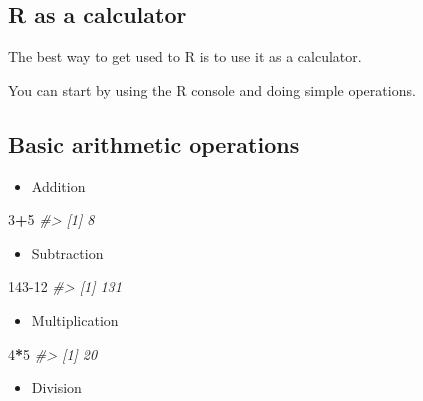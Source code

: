 \documentclass[
]{book}
\newenvironment{Shaded}{\begin{snugshade}}{\end{snugshade}}
\newcommand{\CommentTok}[1]{\textcolor[rgb]{0.56,0.35,0.01}{\textit{#1}}}
\newcommand{\DecValTok}[1]{\textcolor[rgb]{0.00,0.00,0.81}{#1}}
\newcommand{\SpecialCharTok}[1]{\textcolor[rgb]{0.81,0.36,0.00}{\textbf{#1}}}
\providecommand{\tightlist}{%
  \setlength{\itemsep}{0pt}\setlength{\parskip}{0pt}}
\begin{document}
\subsection*{R as a calculator}\label{r-as-a-calculator}

The best way to get used to R is to use it as a calculator.

You can start by using the R console and doing simple operations.

\subsection*{Basic arithmetic operations}\label{basic-arithmetic-operations}

\begin{itemize}
\tightlist
\item
  Addition
\end{itemize}

\begin{Shaded}
\begin{Highlighting}[]
\DecValTok{3}\SpecialCharTok{+}\DecValTok{5}
\CommentTok{\#\textgreater{} [1] 8}
\end{Highlighting}
\end{Shaded}

\begin{itemize}
\tightlist
\item
  Subtraction
\end{itemize}

\begin{Shaded}
\begin{Highlighting}[]
\DecValTok{143{-}12}
\CommentTok{\#\textgreater{} [1] 131}
\end{Highlighting}
\end{Shaded}

\begin{itemize}
\tightlist
\item
  Multiplication
\end{itemize}

\begin{Shaded}
\begin{Highlighting}[]
\DecValTok{4}\SpecialCharTok{*}\DecValTok{5}
\CommentTok{\#\textgreater{} [1] 20}
\end{Highlighting}
\end{Shaded}

\begin{itemize}
\tightlist
\item
  Division
\end{itemize}
\end{document}
